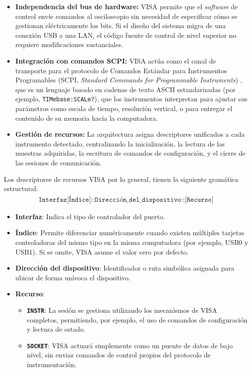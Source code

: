 \begin{itemize}
    \item \textbf{Independencia del bus de hardware:} VISA permite que el \emph{software} de control envíe comandos al osciloscopio sin necesidad de especificar cómo se gestionan eléctricamente los bits. Si el diseño del sistema migra de una conexión USB a una LAN, el código fuente de control de nivel superior no requiere modificaciones sustanciales.
    \item \textbf{Integración con comandos SCPI:} VISA actúa como el canal de transporte para el protocolo de Comandos Estándar para Instrumentos Programables (SCPI, \emph{Standard Commands for Programmable Instruments}) \cite{rohde_schwarz_scpi}, que es un lenguaje basado en cadenas de texto ASCII estandarizadas (por ejemplo, \texttt{TIMebase:SCALe?}), que los instrumentos interpretan para ajustar sus parámetros como escala de tiempo, resolución vertical, o para entregar el contenido de su memoria hacia la computadora.
    \item \textbf{Gestión de recursos:} La arquitectura asigna descriptores unificados a cada instrumento detectado, centralizando la inicialización, la lectura de las muestras adquiridas, la escritura de comandos de configuración, y el cierre de las sesiones de comunicación.
\end{itemize}

Los descriptores de recursos VISA por lo general, tienen la siguiente gramática estructural:
\begin{align*}
    \texttt{Interfaz[Índice]::Dirección\_del\_dispositivo::[Recurso]}
\end{align*}

\begin{itemize}
    \item \textbf{Interfaz}: Indica el tipo de controlador del puerto.
    \item \textbf{Índice}: Permite diferenciar numéricamente cuando existen múltiples tarjetas controladoras del mismo tipo  en la misma computadora (por ejemplo, USB0 y USB1). Si se omite, VISA asume el valor cero por defecto.
    \item \textbf{Dirección del dispositivo}: Identificador o ruta simbólica asignada para ubicar de forma unívoca el dispositivo.
    \item \textbf{Recurso}:
    \begin{itemize}
        \item \textbf{\texttt{INSTR}}: La sesión se gestiona utilizando los mecanismos de VISA completos, permitiendo, por ejemplo, el uso de comandos de configuración y lectura de estado.
        \item \textbf{\texttt{SOCKET}}: VISA actuará simplemente como un puente de datos de bajo nivel, sin enviar comandos de control propios del protocolo de instrumentación.
    \end{itemize}
\end{itemize}

